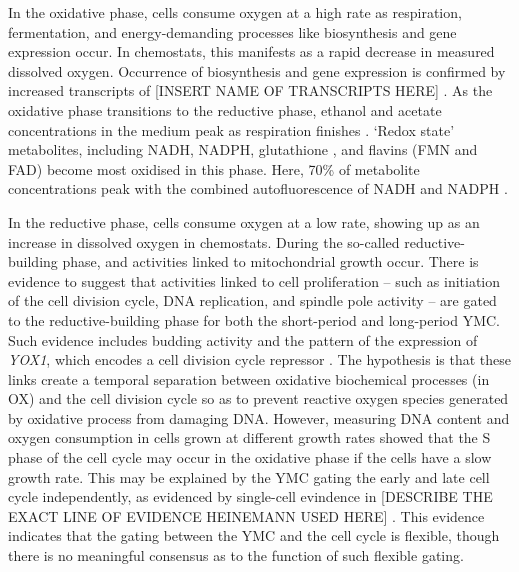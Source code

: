 In the oxidative phase, cells consume oxygen at a high rate as respiration, fermentation, and
energy-demanding processes
like biosynthesis and gene expression occur.
In chemostats, this manifests as a rapid decrease in measured dissolved oxygen.
Occurrence of biosynthesis and gene expression is confirmed by increased transcripts of [INSERT NAME OF TRANSCRIPTS HERE] \parencite{tuLogicYeastMetabolic2005}.
As the oxidative phase transitions to the reductive phase, ethanol and acetate concentrations in the medium peak as respiration finishes \citep{tuLogicYeastMetabolic2005}.
`Redox state' metabolites, including NADH, NADPH, glutathione \citep{lloydUltradianMetronomeTimekeeper2005}, and flavins (FMN and FAD) %
\parencite{murrayRedoxRegulationRespiring2011} become most oxidised in this phase.
Here, 70\% of metabolite concentrations peak with the combined autofluorescence of NADH and NADPH \citep{murrayRegulationYeastOscillatory2007}.

In the reductive phase, cells consume oxygen at a low rate, showing up as an increase in dissolved oxygen in chemostats.
During the so-called reductive-building phase, and activities linked to mitochondrial growth occur.
There is evidence to suggest that activities linked to cell proliferation -- such as initiation of the cell division cycle, DNA replication, and spindle pole activity -- are gated to the reductive-building phase for both the short-period and long-period YMC.
Such evidence includes budding activity and the pattern of the expression of \emph{YOX1}, which encodes a cell division cycle repressor \citep{tuLogicYeastMetabolic2005}.
The hypothesis is that these links create a temporal separation between oxidative biochemical processes (in OX) and the cell division cycle so as to prevent reactive oxygen species generated by oxidative process from damaging DNA.
However, measuring DNA content and oxygen consumption in cells grown at different growth rates \citep{slavovCouplingGrowthRate2011} showed that the S phase of the cell cycle may occur in the oxidative phase if the cells have a slow growth rate.
This may be explained by the YMC gating the early and late cell cycle independently, as evidenced by single-cell evindence in [DESCRIBE THE EXACT LINE OF EVIDENCE HEINEMANN USED HERE] \parencite{papagiannakisAutonomousMetabolicOscillations2017}.
This evidence indicates that the gating between the YMC and the cell cycle is flexible,
though there is no meaningful consensus as to the function of such flexible gating.

